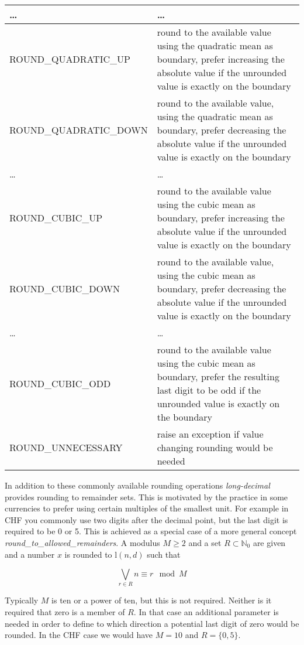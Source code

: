 \documentclass[10pt,a4paper]{article}
\def\ld{\mathrm l}
\begin{document}
\begin{tabular}{|l|p{100mm}|}
\hline
  \dots & \ldots\\
\hline
  ROUND\_QUADRATIC\_UP      & round to the available value using the quadratic mean as boundary, prefer increasing the absolute value if the unrounded value is exactly on the boundary\\
\hline
  ROUND\_QUADRATIC\_DOWN    & round to the available value, using the quadratic mean as boundary, prefer decreasing the absolute value if the unrounded value is exactly on the boundary\\
\hline
  \dots & \ldots\\
\hline
  ROUND\_CUBIC\_UP      & round to the available value using the cubic mean as boundary, prefer increasing the absolute value if the unrounded value is exactly on the boundary\\
\hline
  ROUND\_CUBIC\_DOWN    & round to the available value, using the cubic mean as boundary, prefer decreasing the absolute value if the unrounded value is exactly on the boundary\\
\hline
  \dots & \ldots\\
\hline
  ROUND\_CUBIC\_ODD    & round to the available value using the cubic mean as boundary, prefer the resulting last digit to be odd if the unrounded value is exactly on the boundary\\
\hline
  ROUND\_UNNECESSARY  & raise an exception if value changing rounding would be needed\\
\hline
\end{tabular}

\newpage
In addition to these commonly available rounding operations {\slshape long-decimal\/} provides rounding to remainder sets.  This is motivated by the practice in some
currencies to prefer using certain multiples of the smallest unit.  For example in CHF you commonly use two digits after the decimal point, but the last digit is
required to be 0 or 5.  This is achieved as a special case of a more general concept {\slshape round\_to\_allowed\_remainders\/}.  A modulus $M \ge 2$ and a set
$R\subset\mathbb{N}_0$ are given and a number $x$ is rounded to $\ld(n, d)$ such that

$$\bigvee_{r\in R} n \equiv r \mod M$$

Typically $M$ is ten or a power of ten, but this is not required.  Neither is it required that zero is a member of $R$.  In that case an additional parameter is needed
in order to define to which direction a potential last digit of zero would be rounded.  In the CHF case we would have $M=10$ and $R=\{0, 5\}$.
\end{document}
